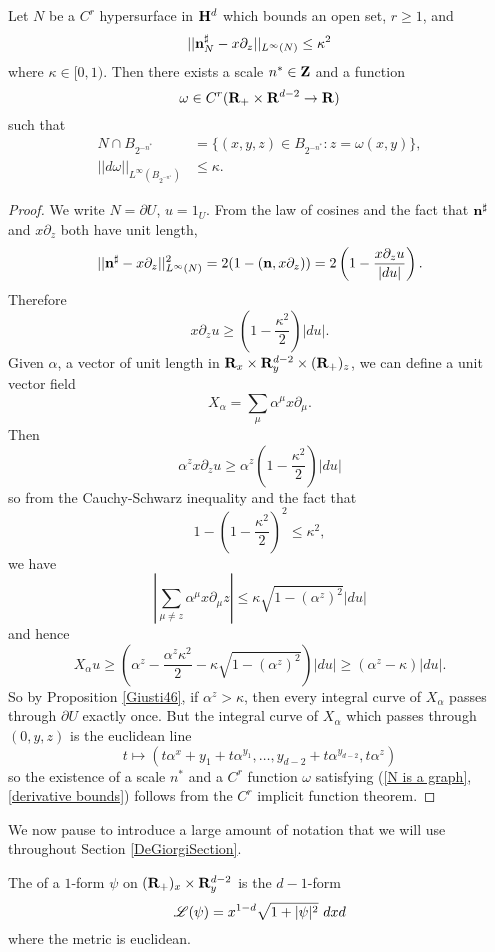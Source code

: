 \begin{lemma}\label{hopfKilling}
Let $N$ be a $C^r$ hypersurface in $\mathbf H^d$ which bounds an open set, $r \geq 1$, and
$$||\mathbf n_N^\sharp - x\partial_z||_{L^\infty(N)} \leq \kappa^2$$
where $\kappa \in [0, 1)$.
Then there exists a scale $n^* \in \mathbf{Z}$ and a function
$$\omega \in C^r(\mathbf{R}_+ \times \mathbf{R}^{d - 2} \to \mathbf{R})$$
such that
\begin{align}
    N \cap B_{2^{-n^*}} &= \{(x, y, z) \in B_{2^{-n^*}}: z = \omega(x, y)\}, \label{N is a graph}\\
    ||d\omega||_{L^\infty(B_{2^{-n^*}})} &\leq \kappa. \label{derivative bounds}
\end{align}
\end{lemma}
\begin{proof}
We write $N = \partial U$, $u = 1_U$.
From the law of cosines and the fact that $\mathbf n^\sharp$ and $x\partial_z$ both have unit length,
$$||\mathbf n^\sharp - x\partial_z||_{L^\infty(N)}^2 = 2(1 - (\mathbf n, x\partial_z)) = 2\left(1 - \frac{x\partial_z u}{|du|}\right).$$
Therefore
$$x\partial_z u \geq \left(1 - \frac{\kappa^2}{2}\right) |du|.$$
Given $\alpha$, a vector of unit length in $\mathbf{R}_x \times \mathbf{R}^{d - 2}_y \times (\mathbf{R}_+)_z$, we can define a unit vector field
$$X_\alpha = \sum_\mu \alpha^\mu x\partial_\mu.$$
Then
$$\alpha^z x\partial_z u \geq \alpha^z \left(1 - \frac{\kappa^2}{2}\right) |du|$$
so from the Cauchy-Schwarz inequality and the fact that
$$1 - \left(1 - \frac{\kappa^2}{2}\right)^2 \leq \kappa^2,$$
we have
$$\left|\sum_{\mu \neq z} \alpha^\mu x\partial_\mu z\right| \leq \kappa\sqrt{1 - (\alpha^z)^2} |du|$$
and hence
$$X_\alpha u \geq \left(\alpha^z - \frac{\alpha^z \kappa^2}{2} - \kappa\sqrt{1 - (\alpha^z)^2}\right)|du| \geq (\alpha^z - \kappa)|du|.$$
So by Proposition \ref{Giusti46}, if $\alpha^z > \kappa$, then every integral curve of $X_\alpha$ passes through $\partial U$ exactly once.
But the integral curve of $X_\alpha$ which passes through $(0, y, z)$ is the euclidean line
$$t \mapsto (t \alpha^x + y_1 + t \alpha^{y_1}, \dots, y_{d - 2} + t \alpha^{y_{d - 2}}, t \alpha^z)$$
so the existence of a scale $n^*$ and a $C^r$ function $\omega$ satisfying (\ref{N is a graph}, \ref{derivative bounds}) follows from the $C^r$ implicit function theorem.
\end{proof}

We now pause to introduce a large amount of notation that we will use throughout Section \ref{DeGiorgiSection}.

\begin{definition}
The  of a $1$-form $\psi$ on $(\mathbf{R}_+)_x \times \mathbf{R}^{d - 2}_y$ is the $d-1$-form
$$\mathscr L(\psi) = x^{1 - d} \sqrt{1 + |\psi|^2} ~dxd$$
where the metric is euclidean.
\end{definition}

